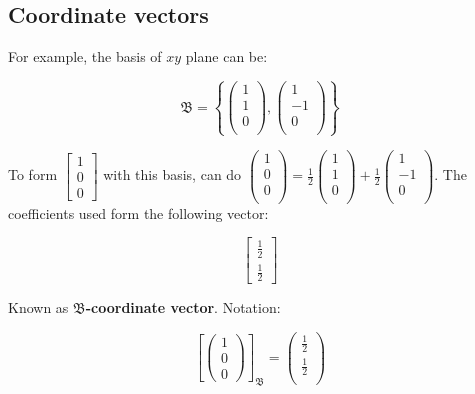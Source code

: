 \subsection{Coordinate vectors}

For example, the basis of $xy$ plane can be:

\[\mathfrak{B}=\left\{\begin{pmatrix} 1\\1\\0\\ \end{pmatrix}, \begin{pmatrix}1\\-1\\0\\ \end{pmatrix}\right\}\]

To form $\begin{bmatrix}1\\ 0\\0\end{bmatrix}$ with this basis, can do $\begin{pmatrix} 1\\0\\0\\ \end{pmatrix}=\frac{1}{2}\begin{pmatrix} 1\\1\\0\\ \end{pmatrix}+\frac{1}{2}\begin{pmatrix}1\\-1\\0\\ \end{pmatrix}$.
The coefficients used form the following vector:

\[\begin{bmatrix}\frac{1}{2}\\ \frac{1}{2}\end{bmatrix}\]

Known as \textbf{$\mathfrak{B}$-coordinate vector}.
Notation:

\[\left[\begin{pmatrix} 1 \\ 0 \\ 0 \end{pmatrix} \right]_\mathfrak{B}=\begin{pmatrix} \frac{1}{2} \\ \frac{1}{2} \\ \end{pmatrix} \]

